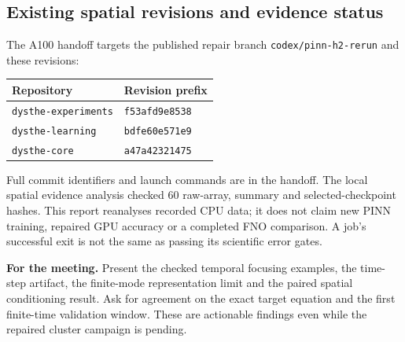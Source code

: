 \subsection{Existing spatial revisions and evidence status}
The A100 handoff targets the published repair branch \texttt{codex/pinn-h2-rerun} and these revisions:
\begin{center}\small
\begin{tabular}{ll}\toprule
Repository & Revision prefix \\\midrule
\texttt{dysthe-experiments} & \texttt{f53afd9e8538} \\
\texttt{dysthe-learning} & \texttt{bdfe60e571e9} \\
\texttt{dysthe-core} & \texttt{a47a42321475} \\\bottomrule
\end{tabular}
\end{center}
Full commit identifiers and launch commands are in the handoff. The local spatial evidence analysis checked 60 raw-array, summary and selected-checkpoint hashes. This report reanalyses recorded CPU data; it does not claim new PINN training, repaired GPU accuracy or a completed FNO comparison. A job's successful exit is not the same as passing its scientific error gates.

\textbf{For the meeting.} Present the checked temporal focusing examples, the time-step artifact, the finite-mode representation limit and the paired spatial conditioning result. Ask for agreement on the exact target equation and the first finite-time validation window. These are actionable findings even while the repaired cluster campaign is pending.
